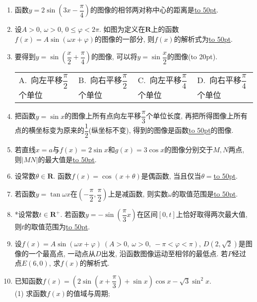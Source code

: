 \documentclass[10pt,a4paper]{article}
\newcommand{\blank}[1]{\underline{\hbox to #1pt{}}}
\newcommand{\bracket}[1]{(\hbox to #1pt{})}
\newcommand{\fourch}[4]{\par\begin{tabular}{p{.23\textwidth}p{.23\textwidth}p{.23\textwidth}p{.23\textwidth}}
A.~#1 &B.~#2& C.~#3& D.~#4
\end{tabular}}
\begin{document}
\begin{enumerate}[1.]
\item 函数$y=2\sin(3x-\dfrac{\pi}4)$的图像的相邻两对称中心的距离是\blank{50}.
\item 设$A>0$, $\omega>0$, $0\le \varphi<2\pi$. 如图为定义在$\mathbf{R}$上的函数$f(x)=A\sin (\omega x+\varphi)$的图像的一部分, 则$f(x)$的解析式为\blank{50}.
\begin{center}
\end{center}
\item 要得到$y=\sin(\dfrac x2+\dfrac{\pi}4)$的图像, 可以将$y=\sin\dfrac x2$的图像\bracket{20}.
\fourch{向左平移$\dfrac{\pi}2$个单位}{向右平移$\dfrac{\pi}2$个单位}{向左平移$\dfrac{\pi}4$个单位}{向右平移$\dfrac{\pi}4$个单位}
\item 把函数$y=\sin x$的图像上所有点向左平移$\dfrac{\pi}3$个单位长度, 再把所得图像上所有点的横坐标变为原来的$\dfrac 12$(纵坐标不变), 得到的图像是函数\blank{50}的图像.
\item 若直线$x=a$与$f(x)=2\sin x$和$g(x)=3\cos x$的图像分别交于$M,N$两点, 则$|MN|$的最大值是\blank{50}.
\item 设常数$\theta\in \mathbf{R}$. 函数$f(x)=\cos(x+\theta)$是偶函数, 当且仅当$\theta=$\blank{50}.
\item 若函数$y=\tan \omega x$在$(-\dfrac{\pi}2,\dfrac{\pi}2)$上是减函数, 则实数$\omega$的取值范围是\blank{50}.
\item *设常数$t\in \mathbf{R}^+$. 若函数$y=-\sin (\dfrac{\pi }3x)$在区间$[0,t]$上恰好取得两次最大值, 则$t$的取值范围为\blank{50}.
\item 设$f(x)=A\sin(\omega x+\varphi) \ (A>0, \ \omega>0, \ -\pi<\varphi<\pi)$, $D(2,\sqrt 2)$是图像的一个最高点, 一动点从$D$出发, 沿函数图像运动至相邻的最低点. 若$P$经过点$E(6,0)$, 求$f(x)$的解析式.
\item 已知函数$f(x)=(2\sin(x+\dfrac{\pi}3)+\sin x)\cos x-\sqrt 3\sin^2 x$.\\
(1) 求函数$f(x)$的值域与周期;\\

\end{enumerate}
\end{document}
